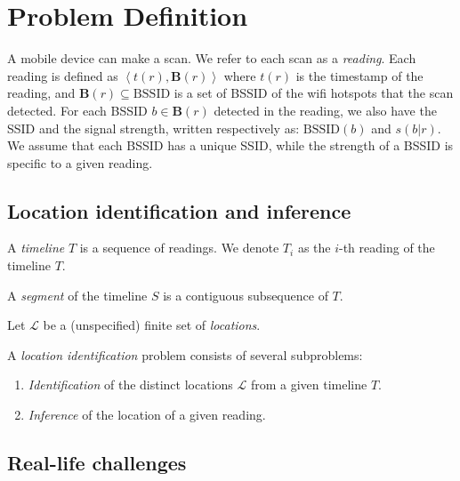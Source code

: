 \newcommand{\bssid}{\mathbf{B}}
\newcommand{\ssid}{\mathrm{BSSID}}

\section{Problem Definition}

\label{sec:problem-def}

A mobile device can make a scan.  We refer to each scan as a {\em reading}.
Each reading is defined as $\left<t(r), \bssid(r)\right>$ where $t(r)$ is
the timestamp of the reading, and $\bssid(r)\subseteq\mathrm{BSSID}$ is a set of
BSSID of the wifi hotspots that the scan detected. For each BSSID $b\in
\bssid(r)$ detected in the reading, we also have the SSID and the signal
strength, written respectively as:
$\ssid(b)$ and $s(b|r)$.  We assume that each BSSID has a unique SSID, while the
strength of a BSSID is specific to a given reading.

\subsection{Location identification and inference}

\begin{definition}
    A {\em timeline} $T$ is a sequence of readings.  
    We denote $T_i$ as the $i$-th reading of the timeline $T$.

    A {\em segment} of the timeline $S$ is a contiguous subsequence of $T$.
\end{definition}

Let $\mathcal{L}$ be a (unspecified) finite set of {\em locations}.

\begin{definition}
    A {\em location identification} problem consists of several subproblems:

    \begin{enumerate}
        \item {\em Identification} of the distinct locations $\mathcal{L}$ from
            a given timeline $T$.
        \item {\em Inference} of the location of a given reading.
    \end{enumerate}
\end{definition}

\subsection{Real-life challenges}

